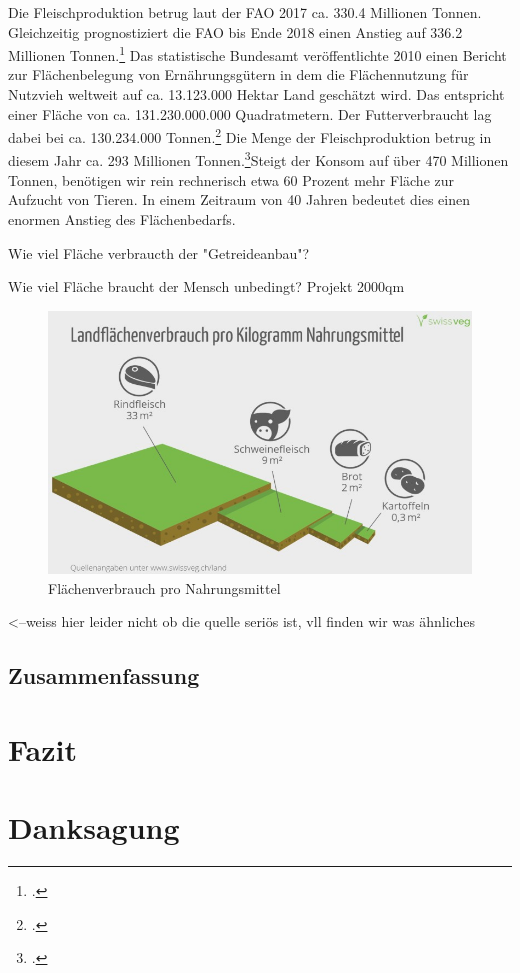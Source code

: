\documentclass{scrartcl}
\begin{document}
Die Fleischproduktion betrug laut der FAO 2017 ca. 330.4 Millionen Tonnen. Gleichzeitig prognostiziert die FAO bis Ende 2018 einen Anstieg auf 336.2 Millionen Tonnen.\footcite[Vgl.][S. 7]{} Das statistische Bundesamt veröffentlichte 2010 einen Bericht zur Flächenbelegung von Ernährungsgütern in dem die Flächennutzung für Nutzvieh weltweit auf ca. 13.123.000 Hektar Land geschätzt wird. Das entspricht einer Fläche von ca. 131.230.000.000 Quadratmetern. Der Futterverbraucht lag dabei bei ca. 130.234.000 Tonnen.\footcite[Vgl.][S. 9]{Sttistisches Bundesamt} Die Menge der Fleischproduktion betrug in diesem Jahr ca. 293 Millionen Tonnen.\footcite[Vgl.]{Institute for agricultere & trade Policy}Steigt der Konsom auf über 470 Millionen Tonnen, benötigen wir rein rechnerisch etwa 60 Prozent mehr Fläche zur Aufzucht von Tieren. In einem Zeitraum von 40 Jahren bedeutet dies einen enormen Anstieg des Flächenbedarfs.

Wie viel Fläche verbraucth der "Getreideanbau"?

Wie viel Fläche braucht der Mensch unbedingt?
    Projekt 2000qm

\begin{figure}[htbp]
\centering
\includegraphics[width=14cm]{image_folder/landverbrauch.jpg}
\caption{Flächenverbrauch pro Nahrungsmittel}
\label{fig:Flächenverbrauch proNahrungsmittel}
\end{figure}<--weiss hier leider nicht ob die quelle seriös ist, vll finden wir was ähnliches

\subsection{Zusammenfassung}

\section{Fazit}

\section{Danksagung}

\newpage
\listoffigures

\begingroup
\singlespacing
\setlength\bibitemsep{10pt} %
\printbibliography
\endgroup
\end{document}
